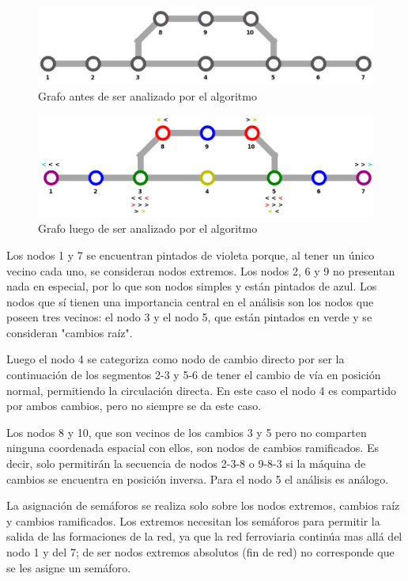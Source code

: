 	\begin{figure}[h]
	\centering
		\includegraphics[scale=.4]{./Figures/Mapa_2_B}
		\caption{Grafo antes de ser analizado por el algoritmo}
		\label{fig:Mapa_2_B}
	\end{figure}
	
	\begin{figure}[h]
	\centering
		\includegraphics[scale=.4]{./Figures/Mapa_2}
		\caption{Grafo luego de ser analizado por el algoritmo}
		\label{fig:Mapa_2}
	\end{figure}		

	Los nodos 1 y 7 se encuentran pintados de violeta porque, al tener un único vecino cada uno, se consideran nodos extremos. Los nodos 2, 6 y 9 no presentan nada en especial, por lo que son nodos simples y están pintados de azul. Los nodos que sí tienen una importancia central en el análisis son los nodos que poseen tres vecinos: el nodo 3 y el nodo 5, que están pintados en verde y se consideran "cambios raíz".

	Luego el nodo 4 se categoriza como nodo de cambio directo por ser la continuación de los segmentos 2-3 y 5-6 de tener el cambio de vía en posición normal, permitiendo la circulación directa. En este caso el nodo 4 es compartido por ambos cambios, pero no siempre se da este caso.
	
	Los nodos 8 y 10, que son vecinos de los cambios 3 y 5 pero no comparten ninguna coordenada espacial con ellos, son nodos de cambios ramificados. Es decir, solo permitirán la secuencia de nodos 2-3-8 o 9-8-3 si la máquina de cambios se encuentra en posición inversa. Para el nodo 5 el análisis es análogo.

	La asignación de semáforos se realiza solo sobre los nodos extremos, cambios raíz y cambios ramificados. Los extremos necesitan los semáforos para permitir la salida de las formaciones de la red, ya que la red ferroviaria continúa mas allá del nodo 1 y del 7; de ser nodos extremos absolutos (fin de red) no corresponde que se les asigne un semáforo.
	
